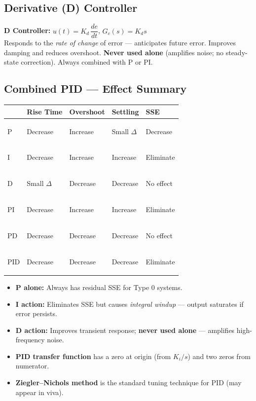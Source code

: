 \documentclass[12pt,a4paper]{article}
\begin{document}
\subsection{Derivative (D) Controller}

\begin{tcolorbox}[defbox]
\textbf{D Controller:} $u(t) = K_d\,\dfrac{de}{dt}$, \quad $G_c(s) = K_d s$\\[3pt]
Responds to the \textit{rate of change} of error — anticipates future error. Improves damping and reduces overshoot. \textbf{Never used alone} (amplifies noise; no steady-state correction). Always combined with P or PI.
\end{tcolorbox}

\subsection{Combined PID — Effect Summary}

\begin{tabularx}{\linewidth}{|>{\bfseries\raggedright\arraybackslash}p{1.8cm}|>{\centering\arraybackslash}X|>{\centering\arraybackslash}X|>{\centering\arraybackslash}X|>{\centering\arraybackslash}X|}
\hline
\multicolumn{1}{|>{\centering\arraybackslash}p{1.8cm}|}{\textbf{Controller}} &
\textbf{Rise Time} & \textbf{Overshoot} & \textbf{Settling} & \textbf{SSE} \\
\hline
P   & Decrease       & Increase  & Small $\Delta$ & Decrease  \\
\hline
I   & Decrease       & Increase  & Increase       & Eliminate \\
\hline
D   & Small $\Delta$ & Decrease  & Decrease       & No effect \\
\hline
PI  & Decrease       & Increase  & Increase       & Eliminate \\
\hline
PD  & Decrease       & Decrease  & Decrease       & No effect \\
\hline
PID & Decrease       & Decrease  & Decrease       & Eliminate \\
\hline
\end{tabularx}

\begin{tcolorbox}[exambox, title={Exam Tips — PID}]
\begin{itemize}[leftmargin=*, itemsep=3pt, topsep=0pt]
  \item \textbf{P alone:} Always has residual SSE for Type 0 systems.
  \item \textbf{I action:} Eliminates SSE but causes \textit{integral windup} — output saturates if error persists.
  \item \textbf{D action:} Improves transient response; \textbf{never used alone} — amplifies high-frequency noise.
  \item \textbf{PID transfer function} has a zero at origin (from $K_i/s$) and two zeros from numerator.
  \item \textbf{Ziegler–Nichols method} is the standard tuning technique for PID (may appear in viva).
\end{itemize}
\end{tcolorbox}
\end{document}
